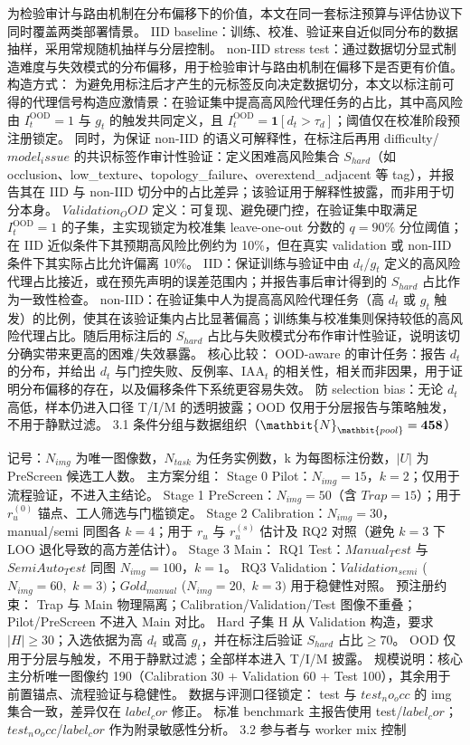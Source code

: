 \documentclass[journal,onecolumn]{IEEEtran}
\begin{document}
为检验审计与路由机制在分布偏移下的价值，本文在同一套标注预算与评估协议下同时覆盖两类部署情景。
IID baseline：训练、校准、验证来自近似同分布的数据抽样，采用常规随机抽样与分层控制。
non-IID stress test：通过数据切分显式制造难度与失效模式的分布偏移，用于检验审计与路由机制在偏移下是否更有价值。
构造方式：
为避免用标注后才产生的元标签反向决定数据切分，本文以标注前可得的代理信号构造应激情景：在验证集中提高高风险代理任务的占比，其中高风险由 $I_t^{\mathrm{OOD}}=1$ 与 $g_t$ 的触发共同定义，且 $I_t^{\mathrm{OOD}}=\mathbf{1}[d_t>\tau_d]$；阈值仅在校准阶段预注册锁定。
同时，为保证 non-IID 的语义可解释性，在标注后再用 difficulty/$model_issue$ 的共识标签作审计性验证：定义困难高风险集合 $S_{hard}$（如 occlusion、low_texture、topology_failure、overextend_adjacent 等 tag），并报告其在 IID 与 non-IID 切分中的占比差异；该验证用于解释性披露，而非用于切分本身。
$Validation_OOD$ 定义：可复现、避免硬门控，在验证集中取满足 $I_t^{\mathrm{OOD}}=1$ 的子集，主实现锁定为校准集 leave-one-out 分数的 $q=90\%$ 分位阈值；在 IID 近似条件下其预期高风险比例约为 10\%，但在真实 validation 或 non-IID 条件下其实际占比允许偏离 10\%。
IID：保证训练与验证中由 $d_t$/$g_t$ 定义的高风险代理占比接近，或在预先声明的误差范围内；并报告事后审计得到的 $S_{hard}$ 占比作为一致性检查。
non-IID：在验证集中人为提高高风险代理任务（高 $d_t$ 或 $g_t$ 触发）的比例，使其在该验证集内占比显著偏高；训练集与校准集则保持较低的高风险代理占比。随后用标注后的 $S_{hard}$ 占比与失败模式分布作审计性验证，说明该切分确实带来更高的困难/失效暴露。
核心比较：
OOD-aware 的审计任务：报告 $d_t$ 的分布，并给出 $d_t$ 与门控失败、反例率、$\mathrm{IAA}_t$ 的相关性，相关而非因果，用于证明分布偏移的存在，以及偏移条件下系统更容易失效。
防 selection bias：无论 $d_t$ 高低，样本仍进入口径 T/I/M 的透明披露；OOD 仅用于分层报告与策略触发，不用于静默过滤。
3.1 条件分组与数据组织（$\mathbit{N}_{\mathbit{pool}}=\mathbf{458}$）

记号：$N_{img}$ 为唯一图像数，$N_{task}$ 为任务实例数，k 为每图标注份数，$\left|U\right|$ 为 PreScreen 候选工人数。
主方案分组：
Stage 0 Pilot：$N_{img}=15$，$k=2$；仅用于流程验证，不进入主结论。
Stage 1 PreScreen：$N_{img}=50$（含 $Trap=15$）；用于 $r_u^{\left(0\right)}$ 锚点、工人筛选与门槛锁定。
Stage 2 Calibration：$N_{img}=30$，manual/semi 同图各 $k=4$；用于 $r_u$ 与 $r_u^{\left(s\right)}$ 估计及 RQ2 对照（避免 $k=3$ 下 LOO 退化导致的高方差估计）。
Stage 3 Main：
RQ1 Test：$Manual_Test$ 与 $SemiAuto_Test$ 同图 $N_{img}=100$，$k=1$。
RQ3 Validation：$Validation_{semi}$ ($N_{img}=60,$ $k=3)$；$Gold_{manual}$ ($N_{img}=20,$ $k=3)$ 用于稳健性对照。
预注册约束：
Trap 与 Main 物理隔离；Calibration/Validation/Test 图像不重叠；Pilot/PreScreen 不进入 Main 对比。
Hard 子集 H 从 Validation 构造，要求$\left|H\right|\geq30$；入选依据为高 $d_t$ 或高 $g_t$，并在标注后验证 $S_{hard}$ 占比$\geq70$。
OOD 仅用于分层与触发，不用于静默过滤；全部样本进入 T/I/M 披露。
规模说明：核心主分析唯一图像约 190（Calibration 30 + Validation 60 + Test 100），其余用于前置锚点、流程验证与稳健性。
数据与评测口径锁定：
test 与 $test_no_occ$ 的 img 集合一致，差异仅在 $label_cor$ 修正。
标准 benchmark 主报告使用 test/$label_cor$；$test_no_occ$/$label_cor$ 作为附录敏感性分析。
3.2 参与者与 worker mix 控制
\end{document}
